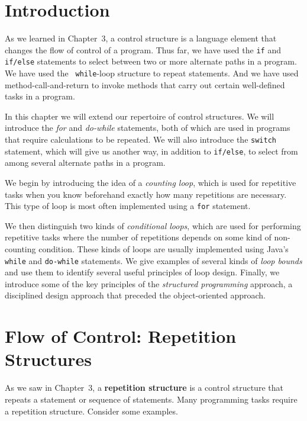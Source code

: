 \section{Introduction}
\noindent As we learned in Chapter~3, a control structure is a language 
element that changes the flow of control of a program. Thus far, we
have used the {\tt if} and {\tt if/else} statements to select between
two or more alternate paths in a program.  We have used the {\tt
while}-loop structure to repeat statements. And we have used
method-call-and-return to invoke methods that carry out certain
well-defined tasks in a program.

In this chapter we will extend our repertoire of control structures.
We will introduce the {\it for} and {\it do-while} statements, both of
which are used in programs that require calculations to be repeated.
We will also introduce the {\tt switch} statement, which will give us
another way, in addition to {\tt if/else}, to select from among
several alternate paths in a program.

We begin by introducing the idea of a {\it counting loop}, which is
used for repetitive tasks when you know beforehand exactly how many
repetitions are necessary.  This type of loop is most often
implemented using a {\tt for} statement.

We then distinguish two kinds of {\it conditional loops}, which are
used for performing repetitive tasks where the number of repetitions
depends on some kind of non-counting condition. These kinds of loops
are usually implemented using Java's {\tt while} and {\tt do-while}
statements.  We give examples of several kinds of {\em loop bounds}
and use them to identify several useful principles of loop design.
Finally, we introduce some of the key principles of the {\it
structured programming} approach, a disciplined design approach that
preceded the object-oriented approach.

\section{Flow of Control: Repetition Structures}
\noindent As we saw in Chapter~3, a {\bf repetition structure} is a control
structure that repeats a statement or sequence of statements.  Many
programming tasks require a repetition structure.  Consider some
examples.

